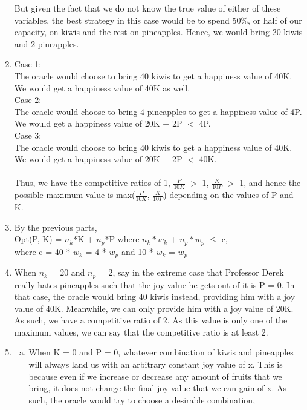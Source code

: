 \documentclass[12pt,letterpaper]{article}
\begin{document}
\begin{enumerate}
    But given the fact that we do not know the true value of either of these variables, 
    the best strategy in this case would be to spend 50\%, or half of our
    capacity, on kiwis and the rest on pineapples.
    Hence, we would bring 20 kiwis and 2 pineapples.
  \item
    Case 1:  \\
    The oracle would choose to bring 40 kiwis to get a happiness value of 40K.
    We would get a happiness value of 40K as well. \\
    Case 2: \\
    The oracle would choose to bring 4 pineapples to get a happiness value of 4P.
    We would get a happiness value of 20K + 2P $<$ 4P. \\
    Case 3: \\
    The oracle would choose to bring 40 kiwis to get a happiness value of 40K.
    We would get a happiness value of 20K + 2P $<$ 40K. \\\\
    Thus, we have the competitive ratios of 1, $\frac{P}{10K}$ $>$ 1, $\frac{K}{10P}$ $>$ 1,
    and hence the possible maximum value is 
    max($\frac{P}{10K}$, $\frac{K}{10P}$) depending on the values of P and K.
  \item
    By the previous parts, \\
    Opt(P, K) = $n_{k}$*K + $n_{p}$*P
    where $n_{k} * w_{k}$ + $n_{p} * w_{p}$ $\leq$ c, \\
    where c = 40 * $w_{k}$ = 4 * $w_{p}$ and 10 * $w_{k}$ = $w_{p}$
  \item
    When $n_{k}$ = 20 and $n_{p}$ = 2, say in the extreme case that 
    Professor Derek really hates pineapples such that the joy value he gets out of it is P = 0.
    In that case, the oracle would bring 40 kiwis instead, providing him with a joy value of 40K.
    Meanwhile, we can only provide him with a joy value of 20K.
    As such, we have a competitive ratio of 2.
    As this value is only one of the maximum values, we can say that the
    competitive ratio is at least 2.
  \item
    \begin{enumerate}[a)]
      \item
        When K = 0 and P = 0, whatever combination of kiwis and pineapples will always
        land us with an arbitrary constant joy value of x.
        This is because even if we increase or decrease any amount of fruits that we bring, 
        it does not change the final joy value that we can gain of x.
        As such, the oracle would try to choose a desirable combination,

\end{enumerate}
\end{enumerate}
\end{document}
